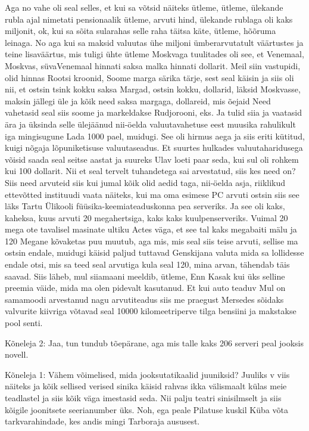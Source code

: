 Aga no vahe oli seal selles, et kui sa võtsid näiteks ütleme, ütleme, ülekande rubla ajal nimetati pensionaalik ütleme, arvuti hind, ülekande rublaga oli kaks miljonit, ok, kui sa sõita sularahas selle raha täitsa käte, ütleme, hõõruma leinaga. No aga kui sa maksid valuutas ühe miljoni ümberarvutatult väärtustes ja teine lisaväärtus, mis tuligi ühte ütleme Moskvaga tuulitades oli see, et Venemaal, Moskvas, süvaVenemaal hinnati saksa malka hinnati dollarit. Meil siin vastupidi, olid hinnas Rootsi kroonid, Soome marga särika tärje, sest seal käisin ja siis oli nii, et ostsin tsink kokku saksa Margad, ostsin kokku, dollarid, läksid Moskvasse, maksin jällegi üle ja kõik need saksa margaga, dollareid, mis õejaid Need vahetasid seal siis soome ja markeldakse Rudjorooni, eks. Ja tulid siia ja vaatasid ära ja üksinda selle ülejäänud nii-öelda valuutavahetuse eest muusika rahulikult iga mingisugune Lada 1000 pael, muidugi. See oli hirmus aega ja siis eriti kütitud, kuigi nõgaja lõpuniketisuse valuutaseadus. Et suurtes hulkades valuutaharidusega võisid saada seal seitse aastat ja suureks Ulav loeti paar seda, kui sul oli rohkem kui 100 dollarit. Nii et seal tervelt tuhandetega sai arvestatud, siis kes need on? Siis need arvuteid siis kui jumal kõik olid aedid taga, nii-öelda asja, riiklikud ettevõtted instituudi vaata näiteks, kui ma oma esimese PC arvuti ostsin siis see läks Tartu Ülikooli füüsika-keemiateaduskonna pea serveriks. Ja see oli kaks, kaheksa, kuus arvuti 20 megahertsiga, kaks kaks kuulpenserveriks. Vuimal 20 mega ote tavalisel masinate ultiku Actes väga, et see tal kaks megabaiti mälu ja 120 Megane kõvaketas puu muutub, aga mis, mis seal siis teise arvuti, sellise ma ostsin endale, muidugi käisid paljud tuttavad Genskijana valuta mida sa lollidesse endale otsi, mis sa teed seal arvutiga kula seal 120, mina arvan, tähendab täis saavad. Siis läheb, mul siiamaani meeldib, ütleme, Enn Kasak kui üks selline preemia väide, mida ma olen pidevalt kasutanud. Et kui auto teaduv Mul on samamoodi arvestanud nagu arvutiteadus siis me praegust Mersedes sõidaks valvurite kiivriga võtavad seal 10000 kilomeetriperve tilga bensiini ja makstakse pool senti.
                 
Kõneleja 2:
Jaa, tun tundub tõepärane, aga mis talle kaks 206 serveri peal jooksis novell.
                 
Kõneleja 1:
Vähem võimelised, mida jooksutatikaalid juuniksid? Juuliks v viis näiteks ja kõik sellised verised sinika käisid rahvas ikka välismaalt külas meie teadlastel ja siis kõik väga imestasid seda. Nii palju teatri sinisilmselt ja siis kõigile joonitsete seerianumber üks. Noh, ega peale Pilatuse kuskil Küba võta tarkvarahindade, kes andis mingi Tarboraja aususest.
                 
